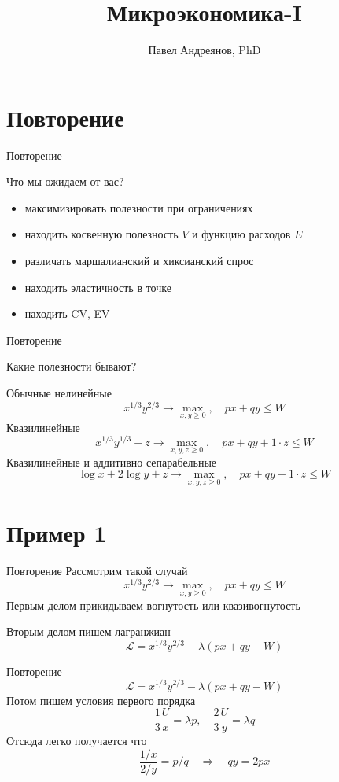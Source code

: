 \documentclass{beamer}
\title{
Микроэкономика-I
}
\author{
Павел Андреянов, PhD
}
\begin{document}
\maketitle

\section{Повторение}

\begin{frame}{Повторение}

Что мы ожидаем от вас?

\begin{itemize}
\item максимизировать полезности при ограничениях
\item находить косвенную полезность $V$ и функцию расходов $E$
\item различать маршалианский и хиксианский спрос
\item находить эластичность в точке
\item находить CV, EV
\end{itemize}

\end{frame}

\begin{frame}{Повторение}

Какие полезности бывают?

Обычные нелинейные
$$ x^{1/3}y^{2/3} \to \max_{x,y \geqslant 0}, \quad px + qy \leqslant W$$
Квазилинейные
$$ x^{1/3}y^{1/3} + z\to \max_{x,y,z \geqslant 0}, \quad px + qy + 1\cdot z \leqslant W$$
Квазилинейные и аддитивно сепарабельные
$$ \log x + 2\log y + z\to \max_{x,y,z \geqslant 0}, \quad px + qy + 1\cdot z \leqslant W$$
\end{frame}

\section{Пример 1}

\begin{frame}{Повторение}
Рассмотрим такой случай
$$ x^{1/3}y^{2/3} \to \max_{x,y \geqslant 0}, \quad px + qy \leqslant W$$
Первым делом прикидываем вогнутость или квазивогнутость

Вторым делом пишем лагранжиан
$$\mathcal{L} = x^{1/3}y^{2/3} - \lambda (px + qy - W)$$
\end{frame}

\begin{frame}{Повторение}
$$\mathcal{L} = x^{1/3}y^{2/3} - \lambda (px + qy - W)$$
Потом пишем условия первого порядка
$$ \frac{1}{3}\frac{U}{x} = \lambda p, \quad \frac{2}{3}\frac{U}{y} = \lambda q$$
Отсюда легко получается что
$$ \frac{1/x}{2/y} = p/q \quad \Rightarrow \quad q y = 2 p x$$
\end{frame}
\end{document}
